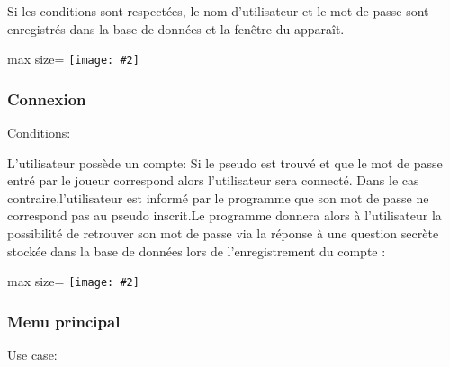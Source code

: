 \documentclass[french, utf8]{article}
\newcommand*{\MyIncludeGraphicsMaxSize}[2][]{%
\begin{adjustbox}{max size={\textwidth}{\textheight}}
    \texttt{[image: \#2]}%
\end{adjustbox}
}
\begin{document}
Si les conditions sont respectées, le nom d'utilisateur et le mot de passe sont enregistrés dans
la base de données et la fenêtre du
 apparaît.

\begin{comment}
L'utilisateur devra créer un compte, et ainsi enregistrer le compte dans la base de données. Lorsque l'utilisateur entre un pseudo , le programme cherchera celui-ci dans la base de données et avertira l'utilisateur si son compte n'existe pas.
\end{comment}

\MyIncludeGraphicsMaxSize{Image/account-creation-sequence-diagram.png}

\newpage
\subsubsection{Connexion}
\label{sec:Connexion}
Conditions:

L'utilisateur possède un compte:
\newline
Si le pseudo est trouvé et que le mot de passe entré par le joueur correspond alors l'utilisateur sera connecté.
Dans le cas contraire,l'utilisateur est informé par le programme que son mot de passe ne correspond pas au pseudo inscrit.Le programme donnera alors à l'utilisateur la possibilité de retrouver son mot de passe via la réponse à une question secrète stockée dans la base de données lors de l'enregistrement du compte :

\MyIncludeGraphicsMaxSize{Image/login-sequence-diagram.png}

\newpage
\subsubsection{Menu principal}
\label{sec:MenuPrincipalSystem}

Use case: 
\end{document}
